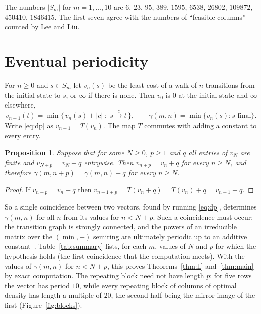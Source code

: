 \documentclass[12pt]{article}
\theoremstyle{plain}
\newtheorem{proposition}[theorem]{Proposition}
\theoremstyle{remark}
\begin{document}
The numbers $|S_m|$ for $m=1,\dots,10$ are $6$, $23$, $95$, $389$, $1595$, $6538$, $26802$,
$109872$, $450410$, $1846415$. The first seven agree with the numbers of ``feasible columns''
counted by Lee and Liu.

\section{Eventual periodicity}\label{sec:periodic}

For $n\ge0$ and $s\in S_m$ let $v_n(s)$ be the least cost of a walk of $n$ transitions from the
initial state to $s$, or $\infty$ if there is none. Then $v_0$ is $0$ at the initial state and
$\infty$ elsewhere,
\begin{equation}\label{eq:dp}
v_{n+1}(t)=\min\bigl\{\,v_n(s)+|c| \;:\; s\xrightarrow{\,c\,}t\,\bigr\},
\qquad
\gamma(m,n)=\min\{v_n(s): s\text{ final}\}.
\end{equation}
Write \eqref{eq:dp} as $v_{n+1}=T(v_n)$. The map $T$ commutes with adding a constant to every
entry.

\begin{proposition}\label{prop:periodic}
Suppose that for some $N\ge0$, $p\ge1$ and $q$ all entries of $v_N$ are finite and
$v_{N+p}=v_N+q$ entrywise. Then $v_{n+p}=v_n+q$ for every $n\ge N$, and therefore
$\gamma(m,n+p)=\gamma(m,n)+q$ for every $n\ge N$.
\end{proposition}

\begin{proof}
If $v_{n+p}=v_n+q$ then $v_{n+1+p}=T(v_n+q)=T(v_n)+q=v_{n+1}+q$.
\end{proof}

So a single coincidence between two vectors, found by running \eqref{eq:dp}, determines
$\gamma(m,n)$ for all $n$ from its values for $n<N+p$. Such a coincidence must occur: the
transition graph is strongly connected, and the powers of an irreducible matrix over the
$(\min,+)$ semiring are ultimately periodic up to an additive constant~\cite[Chapter~3]{bcoq}.
Table~\ref{tab:summary} lists, for each $m$, values of $N$ and $p$ for which the hypothesis
holds (the first coincidence that the computation meets). With the values of
$\gamma(m,n)$ for $n<N+p$, this proves Theorems~\ref{thm:ll} and~\ref{thm:main} by exact
computation. The repeating block need not have length $p$: for five rows the vector has period
$10$, while every repeating block of columns of optimal density has length a multiple of $20$,
the second half being the mirror image of the first (Figure~\ref{fig:blocks}).
\end{document}
